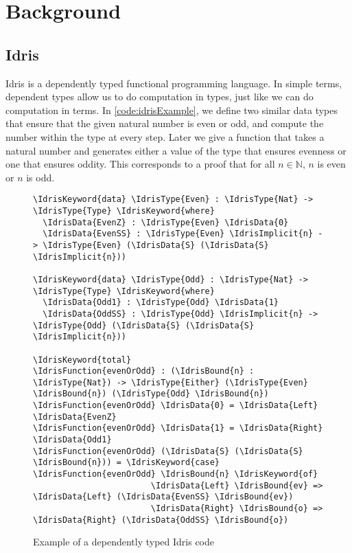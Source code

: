 \section{Background} \label{sec:background}

\subsection{Idris}

Idris is a dependently typed functional programming language. In simple terms,
dependent types allow us to do computation in types, just like we can do
computation in terms.\cite{davidphd} In \autoref{code:idrisExample}, we define
two similar data types that ensure that the given natural number is even or
odd, and compute the number within the type at every step. Later we give a
function that takes a natural number and generates either a value of the type
that ensures evenness or one that ensures oddity. This corresponds to a proof that for all $n \in \mathbb{N}$, $n$ is even or $n$ is odd.

\begin{figure}[ht]
\caption{Example of a dependently typed Idris code}
\label{code:idrisExample}
\begin{Verbatim}[commandchars=\\\{\}]
\IdrisKeyword{data} \IdrisType{Even} : \IdrisType{Nat} -> \IdrisType{Type} \IdrisKeyword{where}
  \IdrisData{EvenZ} : \IdrisType{Even} \IdrisData{0}
  \IdrisData{EvenSS} : \IdrisType{Even} \IdrisImplicit{n} -> \IdrisType{Even} (\IdrisData{S} (\IdrisData{S} \IdrisImplicit{n}))

\IdrisKeyword{data} \IdrisType{Odd} : \IdrisType{Nat} -> \IdrisType{Type} \IdrisKeyword{where}
  \IdrisData{Odd1} : \IdrisType{Odd} \IdrisData{1}
  \IdrisData{OddSS} : \IdrisType{Odd} \IdrisImplicit{n} -> \IdrisType{Odd} (\IdrisData{S} (\IdrisData{S} \IdrisImplicit{n}))

\IdrisKeyword{total}
\IdrisFunction{evenOrOdd} : (\IdrisBound{n} : \IdrisType{Nat}) -> \IdrisType{Either} (\IdrisType{Even} \IdrisBound{n}) (\IdrisType{Odd} \IdrisBound{n})
\IdrisFunction{evenOrOdd} \IdrisData{0} = \IdrisData{Left} \IdrisData{EvenZ}
\IdrisFunction{evenOrOdd} \IdrisData{1} = \IdrisData{Right} \IdrisData{Odd1}
\IdrisFunction{evenOrOdd} (\IdrisData{S} (\IdrisData{S} \IdrisBound{n})) = \IdrisKeyword{case} \IdrisFunction{evenOrOdd} \IdrisBound{n} \IdrisKeyword{of}
                        \IdrisData{Left} \IdrisBound{ev} => \IdrisData{Left} (\IdrisData{EvenSS} \IdrisBound{ev})
                        \IdrisData{Right} \IdrisBound{o} => \IdrisData{Right} (\IdrisData{OddSS} \IdrisBound{o})
\end{Verbatim}
\end{figure}

